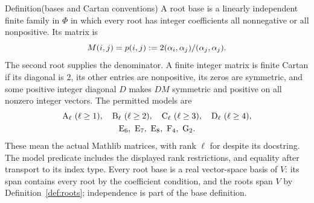\begin{namedresult}{Definition}{(bases and Cartan conventions)}\label{def:rem-bases}
A root base is a linearly independent finite family in $\Phi$ in which every
root has integer coefficients all nonnegative or all nonpositive. Its matrix is
\begin{equation}\label{eq:pairing}
 M(i,j)=p(i,j):=2(\alpha_i,\alpha_j)/(\alpha_j,\alpha_j).
\end{equation}
The second root supplies the denominator. A finite integer matrix is finite
Cartan if its diagonal is 2, its other entries are nonpositive, its zeros
are symmetric, and some positive integer diagonal $D$ makes $DM$ symmetric
and positive on all nonzero integer vectors. The permitted models are
\begin{equation}\label{eq:list}
 \begin{gathered}
 \mathrm{A}_\ell\ (\ell\geq1),\quad \mathrm{B}_\ell\ (\ell\geq2),\quad
 \mathrm{C}_\ell\ (\ell\geq3),\quad \mathrm{D}_\ell\ (\ell\geq4),\\
 \mathrm{E}_6,\ \mathrm{E}_7,\ \mathrm{E}_8,\ \mathrm{F}_4,\ \mathrm{G}_2.
 \end{gathered}
\end{equation}
These mean the actual Mathlib matrices, with rank $\ell$ for
 despite its docstring. The model predicate includes
the displayed rank restrictions, and equality after transport to its index type.
Every root base is a real vector-space basis of $V$: its span contains
every root by the coefficient condition, and the roots span $V$ by
Definition~\ref{def:roots}; independence is part of the base definition.
\end{namedresult}

